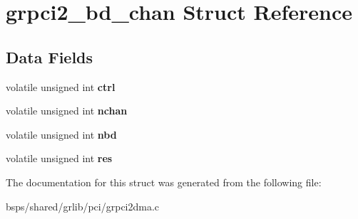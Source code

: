 \hypertarget{structgrpci2__bd__chan}{}\section{grpci2\+\_\+bd\+\_\+chan Struct Reference}
\label{structgrpci2__bd__chan}
\subsection*{Data Fields}
\begin{DoxyCompactItemize}
\item 
\mbox{\label{structgrpci2__bd__chan_a21c3cdd362c448998f28666fd541044c}} 
volatile unsigned int {\bfseries ctrl}
\item 
\mbox{\label{structgrpci2__bd__chan_a7384822c26822f91d1372e215d00c151}} 
volatile unsigned int {\bfseries nchan}
\item 
\mbox{\label{structgrpci2__bd__chan_a7ec9b236cb1693ff60f2d08337b5a537}} 
volatile unsigned int {\bfseries nbd}
\item 
\mbox{\label{structgrpci2__bd__chan_a34331b326700253a990b392c5cc03ee7}} 
volatile unsigned int {\bfseries res}
\end{DoxyCompactItemize}


The documentation for this struct was generated from the following file\+:\begin{DoxyCompactItemize}
\item 
bsps/shared/grlib/pci/grpci2dma.\+c\end{DoxyCompactItemize}
